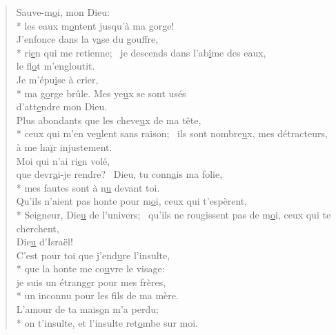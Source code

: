 
\begin{verse}
Sauve-m\underline{o}i, mon Dieu: \\*
les eaux m\underline{o}ntent jusqu’à ma gorge! \\

J’enfonce dans la v\underline{a}se du gouffre, \\*
ri\underline{e}n qui me retienne;~\psalmstar
je descends dans l’ab\underline{î}me des eaux, \\
le fl\underline{o}t m’engloutit. \\

Je m’épu\underline{i}se à crier, \\*
ma g\underline{o}rge brûle.\psalmstar
Mes ye\underline{u}x se sont usés \\
d’att\underline{e}ndre mon Dieu. \\

Plus abondants que les cheve\underline{u}x de ma tête, \\*
ceux qui m’en ve\underline{u}lent sans raison;~\psalmstar
ils sont nombre\underline{u}x, mes détracteurs, \\
à me ha\underline{ï}r injustement. \\

Moi qui n’ai ri\underline{e}n volé, \\
que devr\underline{a}i-je rendre?~\psalmstar
{}Dieu, tu conn\underline{a}is ma folie, \\*
mes fautes sont à n\underline{u} devant toi. \\

Qu’ils n’aient pas honte pour m\underline{o}i, ceux qui t’espèrent, \\*
Seigneur, Die\underline{u} de l’univers;~\psalmstar
qu’ils ne rougissent pas de m\underline{o}i, ceux qui te cherchent, \\
Die\underline{u} d’Israël! \\

C’est pour toi que j’end\underline{u}re l’insulte, \\*
que la honte me co\underline{u}vre le visage: \\
je suis un étrang\underline{e}r pour mes frères, \\*
un inconnu pour les f\underline{i}ls de ma mère. \\
L’amour de ta mais\underline{o}n m’a perdu; \\*
on t’insulte, et l’insulte ret\underline{o}mbe sur moi. \\


\end{verse}
